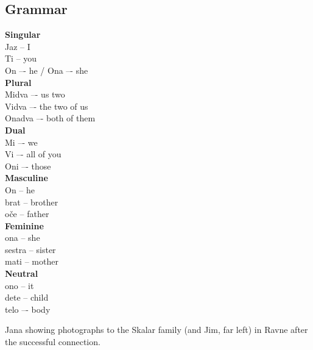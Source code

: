 \subsection{Grammar}

\textbf{Singular}\\
Jaz -- I\\
Ti -- you\\
On –- he / Ona –- she\\
\textbf{Plural}\\   
Midva –- us two\\
Vidva –- the two of us\\
Onadva –- both of them\\
\textbf{Dual}\\
Mi –- we\\
Vi –- all of you\\
Oni –- those\\
\textbf{Masculine}\\
On -- he\\
brat -- brother\\
oče -- father\\
\textbf{Feminine}\\
ona -- she\\
sestra -- sister\\
mati -- mother\\
\textbf{Neutral}\\
ono -- it\\
dete -- child\\
telo –- body\\


\begin{marginfigure}
\checkoddpage \ifoddpage \forcerectofloat \else \forceversofloat \fi
\centering
 \caption{Jana showing photographs to the Skalar family (and Jim, far left) in Ravne after the successful connection. }
 \label{skalar camera}
\end{marginfigure}

